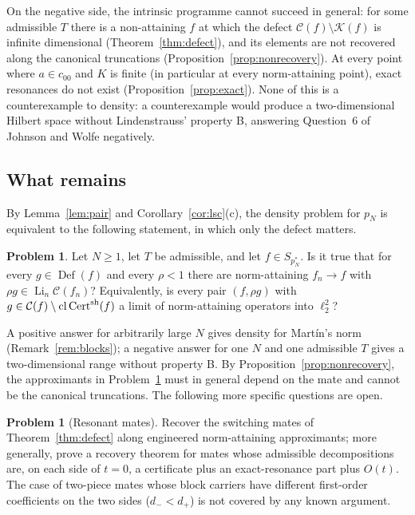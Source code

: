 \documentclass[10pt]{amsart}
\theoremstyle{definition}
\newtheorem{problem}[theorem]{Problem}
\theoremstyle{remark}
\newcommand{\Cset}{\mathcal C}
\newcommand{\Cert}{\operatorname{Cert}}
\newcommand{\Li}{\operatorname*{Li}}
\newcommand{\cl}{\operatorname{cl}}
\newcommand{\Def}{\operatorname{Def}}
\begin{document}
On the negative side, the intrinsic programme cannot succeed in general:
for some admissible $T$ there is a non-attaining $f$ at which the defect
$\Cset(f)\setminus\mathcal K(f)$ is infinite dimensional
(Theorem~\ref{thm:defect}), and its elements are not recovered along the
canonical truncations (Proposition~\ref{prop:nonrecovery}).  At every point
where $a\in c_{00}$ and $K$ is finite (in particular at every norm-attaining
point), exact resonances do not exist (Proposition~\ref{prop:exact}).  None
of this is a counterexample to density: a counterexample would produce a
two-dimensional Hilbert space without Lindenstrauss' property B, answering
Question~6 of Johnson and Wolfe \cite{JW} negatively.

\subsection{What remains}
By Lemma~\ref{lem:pair} and Corollary~\ref{cor:lsc}(c), the density problem
for $p_N$ is equivalent to the following statement, in which only the defect
matters.

\begin{problem}\label{prob:main}
Let $N\ge1$, let $T$ be admissible, and let $f\in S_{p_N^*}$.  Is it true
that for every $g\in\Def(f)$ and every $\rho<1$ there are norm-attaining
$f_n\to f$ with $\rho g\in\Li_n\Cset(f_n)$?  Equivalently, is every pair
$(f,\rho g)$ with $g\in\Cset(f)\setminus\cl\Cert^{\rm sh}(f)$ a limit of
norm-attaining operators into $\ell_2^2$?
\end{problem}

A positive answer for arbitrarily large $N$ gives density for Mart\'in's
norm (Remark~\ref{rem:blocks}); a negative answer for one $N$ and one
admissible $T$ gives a two-dimensional range without property B.  By
Proposition~\ref{prop:nonrecovery}, the approximants in
Problem~\ref{prob:main} must in general depend on the mate and cannot be
the canonical truncations.  The following more specific questions are open.

\begin{problem}[Resonant mates]\label{prob:resonant}
Recover the switching mates of Theorem~\ref{thm:defect} along engineered
norm-attaining approximants; more generally, prove a recovery theorem for
mates whose admissible decompositions are, on each side of $t=0$, a
certificate plus an exact-resonance part plus $O(t)$.  The case of two-piece
mates whose block carriers have different first-order coefficients on the
two sides ($d_-<d_+$) is not covered by any known argument.
\end{problem}
\end{document}

